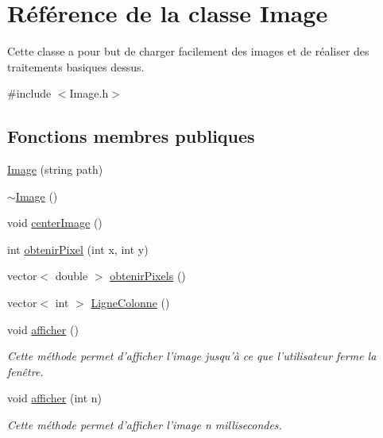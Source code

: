 \hypertarget{classImage}{
\section{Référence de la classe Image}
\label{classImage}
}


Cette classe a pour but de charger facilement des images et de réaliser des traitements basiques dessus.  




{\ttfamily \#include $<$Image.h$>$}

\subsection*{Fonctions membres publiques}
\begin{DoxyCompactItemize}
\item 
\hyperlink{classImage_ab5a8cd26aa2d32873ab871eef30bedf3}{Image} (string path)
\item 
\hyperlink{classImage_a0294f63700543e11c0f0da85601c7ae5}{$\sim$Image} ()
\item 
void \hyperlink{classImage_acf2a77d612bcbcfb91974dcfb484638c}{centerImage} ()
\item 
int \hyperlink{classImage_a2e162095e39208d81a694ec1db43de62}{obtenirPixel} (int x, int y)
\item 
vector$<$ double $>$ \hyperlink{classImage_a481a80ba76112618ef6a2320a40278af}{obtenirPixels} ()
\item 
vector$<$ int $>$ \hyperlink{classImage_ae07d3be7756c4bf735153a65b6281494}{LigneColonne} ()
\item 
\hypertarget{classImage_a4d957034ad17e3911a4d9f7decdda22c}{
void \hyperlink{classImage_a4d957034ad17e3911a4d9f7decdda22c}{afficher} ()}
\label{classImage_a4d957034ad17e3911a4d9f7decdda22c}

\begin{DoxyCompactList}\small\item\em Cette méthode permet d'afficher l'image jusqu'à ce que l'utilisateur ferme la fenêtre. \end{DoxyCompactList}\item 
\hypertarget{classImage_a490bfd3790cdd37f306e0e1751189e63}{
void \hyperlink{classImage_a490bfd3790cdd37f306e0e1751189e63}{afficher} (int n)}
\label{classImage_a490bfd3790cdd37f306e0e1751189e63}

\begin{DoxyCompactList}\small\item\em Cette méthode permet d'afficher l'image n millisecondes. \end{DoxyCompactList}\end{DoxyCompactItemize}
